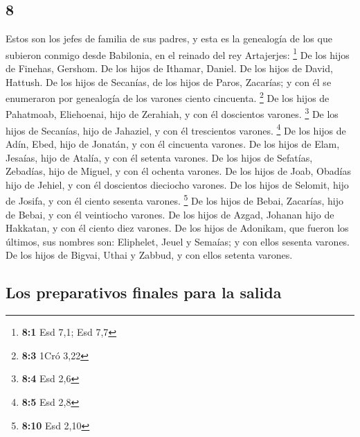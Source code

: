 \begin{paracol}{2}
\hypertarget{section-14}{%
\section{8}\label{section-14}}

 Estos son los jefes de familia de sus padres, y esta es
la genealogía de los que subieron conmigo desde Babilonia, en el reinado
del rey Artajerjes: \footnote{\textbf{8:1} Esd 7,1; Esd 7,7}
 De los hijos de Finehas, Gershom. De los hijos de
Ithamar, Daniel. De los hijos de David, Hattush.  De los
hijos de Secanías, de los hijos de Paros, Zacarías; y con él se
enumeraron por genealogía de los varones ciento cincuenta. \footnote{\textbf{8:3}
  1Cró 3,22}  De los hijos de Pahatmoab, Eliehoenai, hijo
de Zerahiah, y con él doscientos varones. \footnote{\textbf{8:4} Esd 2,6}
 De los hijos de Secanías, hijo de Jahaziel, y con él
trescientos varones. \footnote{\textbf{8:5} Esd 2,8}  De
los hijos de Adín, Ebed, hijo de Jonatán, y con él cincuenta varones.
 De los hijos de Elam, Jesaías, hijo de Atalía, y con él
setenta varones.  De los hijos de Sefatías, Zebadías, hijo
de Miguel, y con él ochenta varones.  De los hijos de
Joab, Obadías hijo de Jehiel, y con él doscientos dieciocho varones.
 De los hijos de Selomit, hijo de Josifa, y con él ciento
sesenta varones. \footnote{\textbf{8:10} Esd 2,10}  De
los hijos de Bebai, Zacarías, hijo de Bebai, y con él veintiocho
varones.  De los hijos de Azgad, Johanan hijo de
Hakkatan, y con él ciento diez varones.  De los hijos de
Adonikam, que fueron los últimos, sus nombres son: Eliphelet, Jeuel y
Semaías; y con ellos sesenta varones.  De los hijos de
Bigvai, Uthai y Zabbud, y con ellos setenta varones.

\hypertarget{los-preparativos-finales-para-la-salida}{%
\subsection{Los preparativos finales para la
salida}\label{los-preparativos-finales-para-la-salida}}


\end{paracol}

